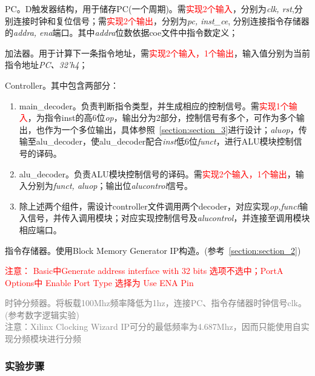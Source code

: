\begin{enumerate}
    \item PC。D触发器结构，用于储存PC(一个周期)。需\textcolor{red}{实现2个输入}，分别为\textit{clk, rst},分别连接时钟和复位信号；需\textcolor{red}{实现2个输出}，分别为\textit{pc, inst\_ce}, 分别连接指令存储器的\textit{addra, ena}端口。其中\textit{addra}位数依据coe文件中指令数定义；
    \item 加法器。用于计算下一条指令地址，需\textcolor{red}{实现2个输入，1个输出}，输入值分别为当前指令地址\textit{PC、32’h4}；
    \item Controller。其中包含两部分：
    \begin{enumerate}
        \item main\_decoder。负责判断指令类型，并生成相应的控制信号。需\textcolor{red}{实现1个输入}，为指令inst的高6位\textit{op}，输出分为2部分，\textcolor{epubblue}{控制信号}有多个，可作为多个输出，也作为一个多位输出，具体参照~\ref{section:section_3}进行设计；\textit{aluop}，传输至alu\_decoder，使alu\_decoder配合\textit{inst}低6位\textit{funct}，进行ALU模块控制信号的译码。
        \item alu\_decoder。负责ALU模块控制信号的译码。需\textcolor{red}{实现2个输入，1个输出}，输入分别为\textit{funct, aluop}；输出位\textit{alucontrol}信号。
        \item 除上述两个组件，需设计controller文件调用两个decoder，\textcolor{epubblue}{对应实现\textit{op,funct}输入信号，并传入调用模块；对应实现控制信号及\textit{alucontrol}，并连接至调用模块相应端口}。
    \end{enumerate}

    \item 指令存储器。使用Block Memory Generator IP构造。(参考~\ref{section:section_2})
    
    \textcolor{red}{ 注意：	Basic中Generate address interface with 32 bits 选项不选中；PortA Options中 Enable Port Type 选择为 Use ENA Pin}
    
    \textcolor{gray}{
    \item 时钟分频器。将板载100Mhz频率降低为1hz，连接PC、指令存储器时钟信号clk。(参考数字逻辑实验)\\
    注意：Xilinx Clocking Wizard IP可分的最低频率为4.687Mhz，因而只能使用自实现分频模块进行分频
    }
\end{enumerate}


\subsubsection{实验步骤}

